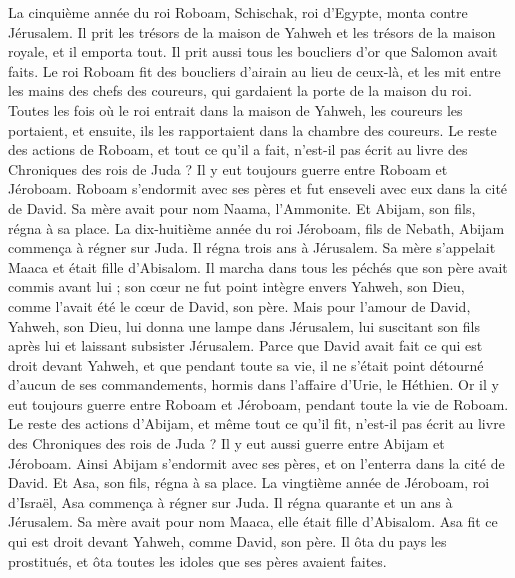 \begin{multicols}{2}
La cinquième année du roi Roboam, Schischak, roi d'Egypte, monta contre Jérusalem.
Il prit les trésors de la maison de Yahweh et les trésors de la maison royale, et il emporta tout. Il prit aussi tous les boucliers d'or que Salomon avait faits.
Le roi Roboam fit des boucliers d'airain au lieu de ceux-là, et les mit entre les mains des chefs des coureurs, qui gardaient la porte de la maison du roi.
Toutes les fois où le roi entrait dans la maison de Yahweh, les coureurs les portaient, et ensuite, ils les rapportaient dans la chambre des coureurs.
Le reste des actions de Roboam, et tout ce qu'il a fait, n'est-il pas écrit au livre des Chroniques des rois de Juda ?
Il y eut toujours guerre entre Roboam et Jéroboam.
Roboam s'endormit avec ses pères et fut enseveli avec eux dans la cité de David. Sa mère avait pour nom Naama, l'Ammonite. Et Abijam, son fils, régna à sa place.
\VerseOne{}La dix-huitième année du roi Jéroboam, fils de Nebath, Abijam commença à régner sur Juda.
Il régna trois ans à Jérusalem. Sa mère s'appelait Maaca et était fille d'Abisalom.
Il marcha dans tous les péchés que son père avait commis avant lui ; son cœur ne fut point intègre envers Yahweh, son Dieu, comme l'avait été le cœur de David, son père.
Mais pour l'amour de David, Yahweh, son Dieu, lui donna une lampe dans Jérusalem, lui suscitant son fils après lui et laissant subsister Jérusalem.
Parce que David avait fait ce qui est droit devant Yahweh, et que pendant toute sa vie, il ne s'était point détourné d'aucun de ses commandements, hormis dans l'affaire d'Urie, le Héthien.
Or il y eut toujours guerre entre Roboam et Jéroboam, pendant toute la vie de Roboam.
Le reste des actions d'Abijam, et même tout ce qu'il fit, n'est-il pas écrit au livre des Chroniques des rois de Juda ? Il y eut aussi guerre entre Abijam et Jéroboam.
Ainsi Abijam s'endormit avec ses pères, et on l'enterra dans la cité de David. Et Asa, son fils, régna à sa place.
La vingtième année de Jéroboam, roi d'Israël, Asa commença à régner sur Juda.
Il régna quarante et un ans à Jérusalem. Sa mère avait pour nom Maaca, elle était fille d'Abisalom.
Asa fit ce qui est droit devant Yahweh, comme David, son père.
Il ôta du pays les prostitués, et ôta toutes les idoles que ses pères avaient faites.

\end{multicols}

